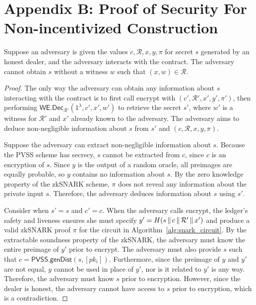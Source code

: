 \section{Appendix B: Proof of Security For Non-incentivized Construction}
\begin{lemma}\label{lemma:non_malleability}
    Suppose an adversary is given the values $c, \mathcal{R}, x, y, \pi$ for secret $s$ generated by an honest dealer, and the adversary interacts with the contract.
    The adversary cannot obtain $s$ without a witness $w$ such that $(x, w) \in \mathcal{R}$.
\end{lemma}
\begin{proof}
    The only way the adversary can obtain any information about $s$ interacting with the contract is to first call \textsf{encrypt} with $(c', \mathcal{R}', x', y', \pi')$,
    then performing $\textsf{WE.Dec}_{\mathcal{R}'}(1^{\lambda}, c', x', w')$ to retrieve the secret $s'$, where $w'$ is a witness for $\mathcal{R}'$ and $x'$ already known to the adversary.
    The adversary aims to deduce non-negligible information about $s$ from $s'$ and $(c, \mathcal{R}, x, y, \pi)$.

    Suppose the adversary can extract non-negligible information about $s$.
    Because the PVSS scheme has secrecy, $s$ cannot be extracted from $c$, since $c$ is an encryption of $s$.
    Since $y$ is the output of a random oracle, all preimages are equally probable, so $y$ contains no information about $s$.
    By the zero knowledge property of the zkSNARK scheme, $\pi$ does not reveal any information about the private input $s$.
    Therefore, the adversary deduces information about $s$ using $s'$.

    Consider when $s' = s$ and $c' = c$.
    When the adversary calls \textsf{encrypt}, the ledger's safety and liveness ensures she must specify $y' = H(s \,\|\, c \,\|\, \mathcal{R}' \,\|\, x')$ and produce a valid zkSNARK proof $\pi$ for the circuit in Algorithm~\ref{alg:snark_circuit}.
    By the extractable soundness property of the zkSNARK, the adversary must know the entire preimage of $y'$ prior to \textsf{encrypt}.
    The adversary must also provide $s$ such that $c = \textsf{PVSS.genDist}(s, [pk_i])$.
    Furthermore, since the preimage of $y$ and $y'$ are not equal, $y$ cannot be used in place of $y'$, nor is it related to $y'$ is any way.
    Therefore, the adversary must know $s$ prior to encryption.
    However, since the dealer is honest, the adversary cannot have access to $s$ prior to encryption, which is a contradiction.


\end{proof}
